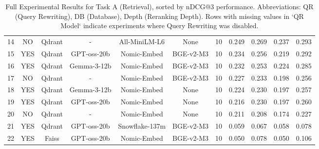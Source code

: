 \documentclass[11pt]{article}
\begin{document}
\begin{table}[h]
\begin{tabular}{|c|c|c|c|c|c|c|c|c|c|c|}
14 & NO & Qdrant & - & All-MiniLM-L6 & None & 10 & 0.249 & 0.269 & 0.237 & 0.293 \\
15 & YES & Qdrant & GPT-oss-20b & Nomic-Embed & BGE-v2-M3 & 10 & 0.234 & 0.256 & 0.219 & 0.292 \\
16 & YES & Qdrant & Gemma-3-12b & Nomic-Embed & BGE-v2-M3 & 10 & 0.232 & 0.253 & 0.224 & 0.285 \\
17 & NO & Qdrant & - & Nomic-Embed & BGE-v2-M3 & 10 & 0.227 & 0.233 & 0.198 & 0.256 \\
18 & YES & Qdrant & Gemma-3-12b & Nomic-Embed & None & 10 & 0.224 & 0.230 & 0.197 & 0.257 \\
19 & YES & Qdrant & GPT-oss-20b & Nomic-Embed & None & 10 & 0.216 & 0.230 & 0.197 & 0.260 \\
20 & NO & Qdrant & - & Nomic-Embed & None & 10 & 0.211 & 0.208 & 0.174 & 0.227 \\
21 & YES & Qdrant & GPT-oss-20b & Snowflake-137m & BGE-v2-M3 & 10 & 0.059 & 0.067 & 0.058 & 0.078 \\
22 & YES & Faiss & GPT-oss-20b & Nomic-Embed & BGE-v2-M3 & 10 & 0.050 & 0.078 & 0.050 & 0.106 \\
\hline
\end{tabular}
\caption{Full Experimental Results for Task A (Retrieval), sorted by nDCG@3 performance. Abbreviations: QR (Query Rewriting), DB (Database), Depth (Reranking Depth). Rows with missing values in `QR Model` indicate experiments where Query Rewriting was disabled.}
\label{tab:full_results}
\end{table}
\end{document}
